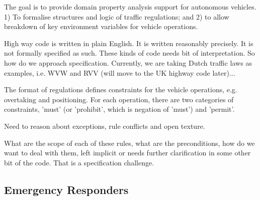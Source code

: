 \documentclass[sigconf]{acmart}
\begin{document}
The goal is to provide domain property analysis support for autonomous vehicles. 
1) To formalise structures and logic of traffic regulations; and 2) to allow breakdown of key environment variables for vehicle operations.

High way code is written in plain English. It is written reasonably precisely. It is not formally specified as such. These kinds of code needs bit of interpretation. So how do we approach specification. Currently, we are taking Dutch traffic laws as examples, i.e. WVW and RVV (will move to the UK highway code later)... 

The format of regulations defines constraints for the vehicle operations, e.g. overtaking and positioning. For each operation, there are two categories of constraints, 'must' (or 'prohibit', which is negation of 'must') and 'permit'.

Need to reason about exceptions, rule conflicts and open texture.

What are the scope of each of these rules, what are the preconditions, how do we want to deal with them, left implicit or needs further clarification in some other bit of the code. That is a specification challenge.

\subsection{Emergency Responders}
\end{document}
